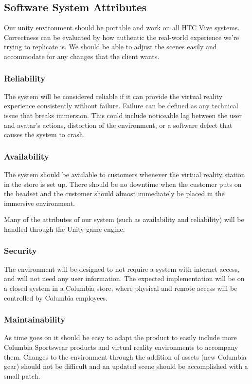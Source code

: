 \documentclass[10pt,journal,compsoc,onecolumn, draftclsnofoot]{IEEEtran}
\begin{document}
\begin{bibunit}
\subsection{Software System Attributes}
Our unity environment should be portable and work on all HTC Vive systems.
Correctness can be evaluated by how authentic the real-world experience we're
trying to replicate is. We should be able to adjust the scenes easily and
accommodate for any changes that the client wants.

\subsubsection{Reliability}
The system will be considered reliable if it can provide the virtual reality
experience consistently without failure. Failure can be defined as any technical
issue that breaks immersion. This could include noticeable lag between the user
and avatar's actions, distortion of the environment, or a software defect that
causes the system to crash.

\subsubsection{Availability}
The system should be available to customers whenever the virtual reality station
in the store is set up. There should be no downtime when the customer puts on
the headset and the customer should almost immediately be placed in the immersive
environment.

Many of the attributes of our system (such as availability and reliability)
will be handled through the Unity game engine.

\subsubsection{Security}
The environment will be designed to not require a system with internet access,
and will not need any user information. The expected implementation will be on
a closed system in a Columbia store, where physical and remote access will be
controlled by Columbia employees.

\subsubsection{Maintainability}
As time goes on it should be easy to adapt the product to easily include more
Columbia Sportswear products and virtual reality environments to accompany them.
Changes to the environment through the addition of assets (new Columbia gear)
should not be difficult and an updated scene should be accomplished with a small patch.


\end{bibunit}
\end{document}
